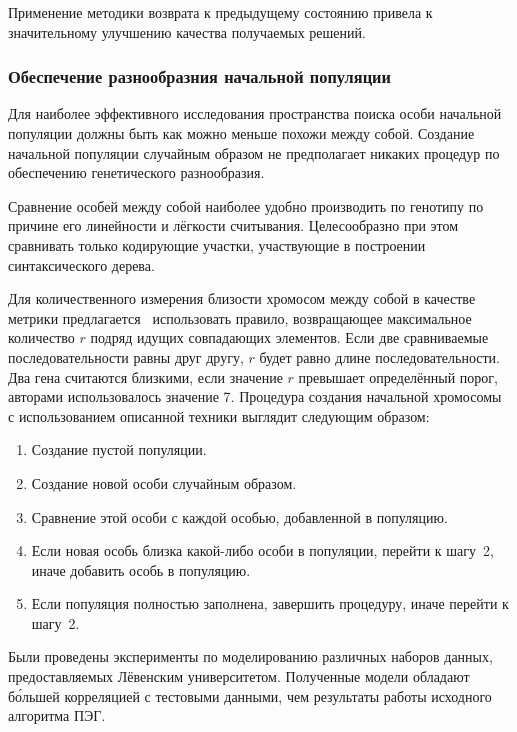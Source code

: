 Применение методики возврата к предыдущему состоянию привела к значительному улучшению качества получаемых решений.


\subsubsection{Обеспечение разнообразния начальной популяции}

Для наиболее эффективного исследования пространства поиска особи начальной популяции должны быть как можно меньше похожи между собой. Создание начальной популяции случайным образом не предполагает никаких процедур по обеспечению генетического разнообразия.

Сравнение особей между собой наиболее удобно производить по генотипу по причине его линейности и лёгкости считывания. Целесообразно при этом сравнивать только кодирующие участки, участвующие в построении синтаксического дерева.

Для количественного измерения близости хромосом между собой в качестве метрики предлагается~\cite{Duan:2007:SID:1304604.1305918} использовать правило, возвращающее максимальное количество $r$ подряд идущих совпадающих элементов. Если две сравниваемые последовательности равны друг другу, $r$ будет равно длине последовательности. Два гена считаются близкими, если значение $r$ превышает определённый порог, авторами использовалось значение 7.
Процедура создания начальной хромосомы с использованием описанной техники выглядит следующим образом:

\begin{enumerate}
  \item Создание пустой популяции.
  \item Создание новой особи случайным образом.
  \item Сравнение этой особи с каждой особью, добавленной в популяцию.
  \item Если новая особь близка какой-либо особи в популяции, перейти к шагу~2, иначе добавить особь в популяцию.
  \item Если популяция полностью заполнена, завершить процедуру, иначе перейти к шагу~2.
\end{enumerate}

Были проведены эксперименты по моделированию различных наборов данных, предоставляемых Лёвенским университетом. Полученные модели обладают б\'{о}льшей корреляцией с тестовыми данными, чем результаты работы исходного алгоритма ПЭГ.


